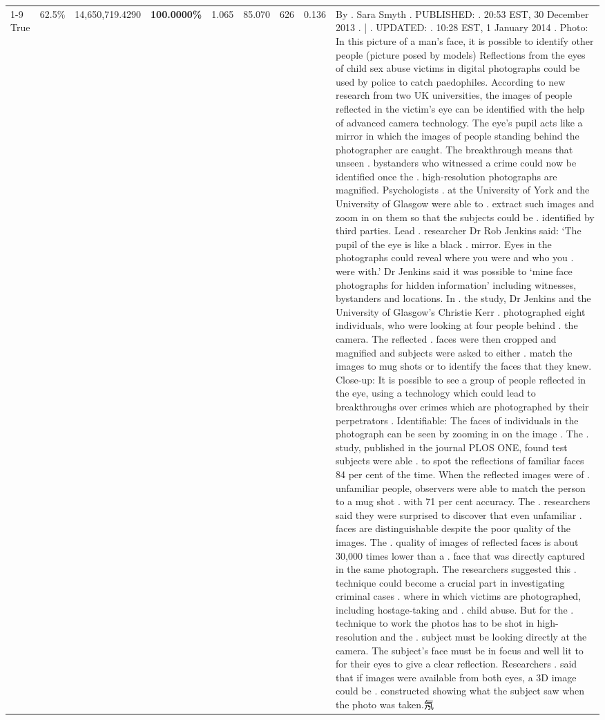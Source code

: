 \begin{table}[H]
\begin{tabular}{lllrlllll}
\cline{1-9} \cline{2-9}
True & 62.5\% & 14,650,719.4290 & \bfseries \color{red} 100.0000\% & 1.065 & 85.070 & 626 & 0.136 & By . Sara Smyth . PUBLISHED: . 20:53 EST, 30 December 2013 . | . UPDATED: . 10:28 EST, 1 January 2014 . Photo: In this picture of a man's face, it is possible to identify other people (picture posed by models) Reflections from the eyes of child sex abuse victims in digital photographs could be used by police to catch paedophiles. According to new research from two UK universities, the images of people reflected in the victim's eye can be identified with the help of advanced camera technology. The eye's pupil acts like a mirror in which the images of people standing behind the photographer are caught. The breakthrough means that unseen . bystanders who witnessed a crime could now be identified once the . high-resolution photographs are magnified. Psychologists . at the University of York and the University of Glasgow were able to . extract such images and zoom in on them so that the subjects could be . identified by third parties. Lead . researcher Dr Rob Jenkins said: ‘The pupil of the eye is like a black . mirror. Eyes in the photographs could reveal where you were and who you . were with.' Dr Jenkins said it was possible to ‘mine face photographs for hidden information' including witnesses, bystanders and locations. In . the study, Dr Jenkins and the University of Glasgow's Christie Kerr . photographed eight individuals, who were looking at four people behind . the camera. The reflected . faces were then cropped and magnified and subjects were asked to either . match the images to mug shots or to identify the faces that they knew. Close-up: It is possible to see a group of people reflected in the eye, using a technology which could lead to breakthroughs over crimes which are photographed by their perpetrators . Identifiable: The faces of individuals in the photograph can be seen by zooming in on the image . The . study, published in the journal PLOS ONE, found test subjects were able . to spot the reflections of familiar faces 84 per cent of the time. When the reflected images were of . unfamiliar people, observers were able to match the person to a mug shot . with 71 per cent accuracy. The . researchers said they were surprised to discover that even unfamiliar . faces are distinguishable despite the poor quality of the images. The . quality of images of reflected faces is about 30,000 times lower than a . face that was directly captured in the same photograph. The researchers suggested this . technique could become a crucial part in investigating criminal cases . where in which victims are photographed, including hostage-taking and . child abuse. But for the . technique to work the photos has to be shot in high-resolution and the . subject must be looking directly at the camera. The subject's face must be in focus and well lit to for their eyes to give a clear reflection. Researchers . said that if images were available from both eyes, a 3D image could be . constructed showing what the subject saw when the photo was taken.氖 \\

\end{tabular}
\end{table}
